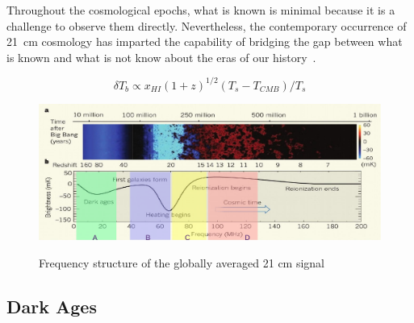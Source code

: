 \documentclass[12pt,a4paper]{report}
\begin{document}
	Throughout the cosmological epochs, what is known is minimal because it is a challenge to observe them directly. Nevertheless, the contemporary occurrence of \SI{21}{cm} cosmology has imparted the capability of bridging the gap between what is known and what is not know about the eras of our history~\citep{2014ApJ...782L...9V, 2013PhRvD..87d3002L}.
	
	\begin{equation}
	\delta{T_b}\propto {x_{HI}}(1+z)^{1/2}({T_s}-{T_{CMB}})/{T_s}
	\end{equation}
	
	\begin{figure}[htb!]
		\begin{center}
			\includegraphics[width=\linewidth]{Figures/epo.pdf}\\
			\caption{Frequency structure of the globally averaged 21 cm signal~\citep{2012RPPh...75h6901P}} 
			\label{Fig:epochs}
		\end{center}
	\end{figure}
	
	

	\subsection{Dark Ages}
	
\end{document}
